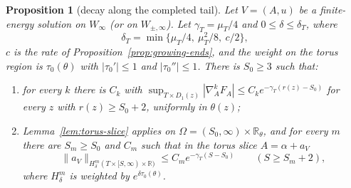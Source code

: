 \documentclass[11pt]{amsart}
\newtheorem{proposition}[theorem]{Proposition}
\theoremstyle{definition}
\theoremstyle{remark}
\theoremstyle{plain}
\numberwithin{equation}{section}
\newcommand{\RR}{\mathbb{R}}
\begin{document}
\begin{proposition}[decay along the completed tail]\label{prop:tail-decay}
Let $V=(A,u)$ be a finite-energy solution on $W_\infty$ (or on $W_{\pm,\infty}$).
Let $\gamma_T=\mu_T/4$ and $0\le\delta\le\delta_T$, where
\[
\delta_T=\min\{\mu_T/4,\ \mu_T^2/8,\ c/2\},
\]
$c$ is the rate of Proposition~\ref{prop:growing-ends}, and the weight on the torus region is
$\tau_0(\theta)$ with $|\tau_0'|\le1$ and $|\tau_0''|\le1$. There is $S_0\ge3$ such that:
\begin{enumerate}[label=(\roman*)]
\item for every $k$ there is $C_k$ with $\sup_{T\times D_1(z)}|\nabla_A^kF_A|\le C_ke^{-\gamma_T(r(z)-S_0)}$
  for every $z$ with $r(z)\ge S_0+2$, uniformly in $\theta(z)$;
\item Lemma~\ref{lem:torus-slice} applies on $\Omega=(S_0,\infty)\times\RR_\theta$, and for every
  $m$ there are $S_m\ge S_0$ and $C_m$ such that in the torus slice $A=\alpha+a_V$
  \[
  \|a_V\|_{H^m_\delta(T\times[S,\infty)\times\RR)}\le C_me^{-\gamma_T(S-S_0)}\qquad(S\ge S_m+2),
  \]
  where $H^m_\delta$ is weighted by $e^{\delta\tau_0(\theta)}$.
\end{enumerate}
\end{proposition}
\end{document}
